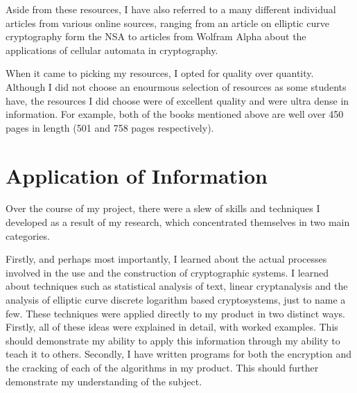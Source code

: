 \documentclass[12pt, a4paper, draft]{report}
\begin{document}
Aside from these resources, I have also referred to a many different
individual articles from various online sources, ranging from an article on
elliptic curve cryptography form the NSA to articles from Wolfram Alpha
about the applications of cellular automata in cryptography.


When it came to picking my resources, I opted for quality over quantity.
Although I did not choose an enourmous selection of resources as some
students have, the resources I did choose were of excellent quality
and were ultra dense in information. For example, both of the books
mentioned above are well over 450 pages in length (501 and 758
pages respectively).

\section*{Application of Information}

Over the course of my project, there were a slew of skills and techniques
I developed as a result of my research, which concentrated themselves in
two main categories.

Firstly, and perhaps most importantly, I learned about the actual processes
involved in the use and the construction of cryptographic systems. I
learned about techniques such as statistical analysis of text, linear
cryptanalysis and the analysis of elliptic curve discrete logarithm based
cryptosystems, just to name a few. These techniques were applied directly
to my product in two distinct ways. Firstly, all of these ideas were explained in detail, with worked examples.
This should demonstrate my ability to apply this information through my
ability to teach it to others. Secondly, I have written programs for
both the encryption and the cracking of each of the algorithms in my
product. This should further demonstrate my understanding of the subject.
\end{document}
